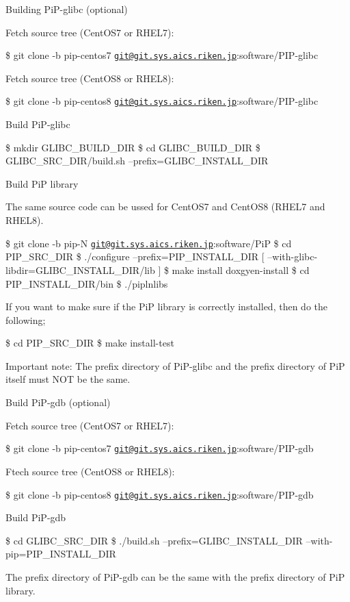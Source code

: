 \documentclass[twoside]{book}
\begin{document}
\begin{DoxyEnumerate}
\item Building Pi\-P-\/glibc (optional)

Fetch source tree (Cent\-O\-S7 or R\-H\-E\-L7)\-:

\$ git clone -\/b pip-\/centos7 \href{mailto:git@git.sys.aics.riken.jp}{\tt git@git.\-sys.\-aics.\-riken.\-jp}\-:software/\-P\-I\-P-\/glibc

Fetch source tree (Cent\-O\-S8 or R\-H\-E\-L8)\-:

\$ git clone -\/b pip-\/centos8 \href{mailto:git@git.sys.aics.riken.jp}{\tt git@git.\-sys.\-aics.\-riken.\-jp}\-:software/\-P\-I\-P-\/glibc

Build Pi\-P-\/glibc

\$ mkdir G\-L\-I\-B\-C\-\_\-\-B\-U\-I\-L\-D\-\_\-\-D\-I\-R \$ cd G\-L\-I\-B\-C\-\_\-\-B\-U\-I\-L\-D\-\_\-\-D\-I\-R \$ G\-L\-I\-B\-C\-\_\-\-S\-R\-C\-\_\-\-D\-I\-R/build.\-sh --prefix=G\-L\-I\-B\-C\-\_\-\-I\-N\-S\-T\-A\-L\-L\-\_\-\-D\-I\-R
\item Build Pi\-P library

The same source code can be ussed for Cent\-O\-S7 and Cent\-O\-S8 (R\-H\-E\-L7 and R\-H\-E\-L8).

\$ git clone -\/b pip-\/\-N \href{mailto:git@git.sys.aics.riken.jp}{\tt git@git.\-sys.\-aics.\-riken.\-jp}\-:software/\-Pi\-P \$ cd P\-I\-P\-\_\-\-S\-R\-C\-\_\-\-D\-I\-R \$ ./configure --prefix=P\-I\-P\-\_\-\-I\-N\-S\-T\-A\-L\-L\-\_\-\-D\-I\-R \mbox{[} --with-\/glibc-\/libdir=G\-L\-I\-B\-C\-\_\-\-I\-N\-S\-T\-A\-L\-L\-\_\-\-D\-I\-R/lib \mbox{]} \$ make install doxgyen-\/install \$ cd P\-I\-P\-\_\-\-I\-N\-S\-T\-A\-L\-L\-\_\-\-D\-I\-R/bin \$ ./piplnlibs

If you want to make sure if the Pi\-P library is correctly installed, then do the following;

\$ cd P\-I\-P\-\_\-\-S\-R\-C\-\_\-\-D\-I\-R \$ make install-\/test

Important note\-: The prefix directory of Pi\-P-\/glibc and the prefix directory of Pi\-P itself must N\-O\-T be the same.
\item Build Pi\-P-\/gdb (optional)

Fetch source tree (Cent\-O\-S7 or R\-H\-E\-L7)\-:

\$ git clone -\/b pip-\/centos7 \href{mailto:git@git.sys.aics.riken.jp}{\tt git@git.\-sys.\-aics.\-riken.\-jp}\-:software/\-P\-I\-P-\/gdb

Ftech source tree (Cent\-O\-S8 or R\-H\-E\-L8)\-:

\$ git clone -\/b pip-\/centos8 \href{mailto:git@git.sys.aics.riken.jp}{\tt git@git.\-sys.\-aics.\-riken.\-jp}\-:software/\-P\-I\-P-\/gdb

Build Pi\-P-\/gdb

\$ cd G\-L\-I\-B\-C\-\_\-\-S\-R\-C\-\_\-\-D\-I\-R \$ ./build.sh --prefix=G\-L\-I\-B\-C\-\_\-\-I\-N\-S\-T\-A\-L\-L\-\_\-\-D\-I\-R --with-\/pip=P\-I\-P\-\_\-\-I\-N\-S\-T\-A\-L\-L\-\_\-\-D\-I\-R

The prefix directory of Pi\-P-\/gdb can be the same with the prefix directory of Pi\-P library.
\end{DoxyEnumerate}
\end{document}
